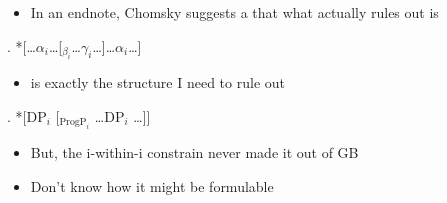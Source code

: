 \documentclass[letterpaper,12pt]{article}
\begin{document}
\begin{itemize}
  \item In an endnote, Chomsky suggests a that what \Last actually rules out is \Next
\end{itemize}
\ex. *[\dots$\alpha_i$\dots[$_{\beta_i}$\dots$\gamma_i$\dots]\dots$\alpha_i$\dots]

\begin{itemize}
  \item \Last is exactly the structure I need to rule out
\end{itemize}
\ex. *[DP$_i$ [$_{\text{ProgP}_i}$ \dots DP$_i$ \dots]]

\begin{itemize}
  \item But, the i-within-i constrain never made it out of GB
  \item Don't know how it might be formulable
\end{itemize}
\end{document}
